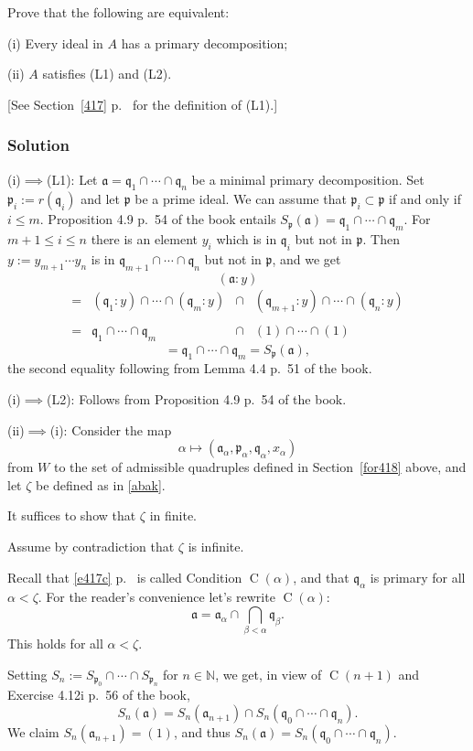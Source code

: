 \documentclass[parskip=half,fontsize=12pt]{scrartcl}%
\newcommand{\oo}{\operatorname}\newcommand{\ooo}{\operatorname*}
\newcommand{\mf}{\mathfrak}
\newcommand{\aaa}{\mf a}
\newcommand{\ppp}{\mf p}
\newcommand{\qqq}{\mf q}
\begin{document}
Prove that the following are equivalent:

(i) Every ideal in $A$ has a primary decomposition;

(ii) $A$ satisfies (L1) and (L2).

[See Section~\ref{417} p.~\pageref{417} for the definition of (L1).]

\subsubsection{Solution}%

(i)$\implies$(L1): Let $\aaa=\qqq_1\cap\cdots\cap\qqq_n$ be a minimal primary decomposition. Set $\ppp_i:=r(\qqq_i)$ and let $\ppp$ be a prime ideal. We can assume that $\ppp_i\subset\ppp$ if and only if $i\le m$. Proposition 4.9 p.~54 of the book entails $S_\ppp(\aaa)=\qqq_1\cap\cdots\cap\qqq_m$. For $m+1\le i\le n$ there is an element $y_i$ which is in $\qqq_i$ but not in $\ppp$. Then $y:=y_{m+1}\cdots y_n$ is in $\qqq_{m+1}\cap\cdots\cap\qqq_n$ but not in $\ppp$, and we get 
$$
(\aaa:y)
$$
$$
\begin{matrix}
=&(\qqq_1:y)\cap\cdots\cap(\qqq_m:y)&\cap&(\qqq_{m+1}:y)\cap\cdots\cap(\qqq_n:y)\\ \\ 
=&\qqq_1\cap\cdots\cap\qqq_m&\cap&(1)\cap\cdots\cap(1)
\end{matrix}
$$
$$
=\qqq_1\cap\cdots\cap\qqq_m=S_\ppp(\aaa),
$$ 
the second equality following from Lemma 4.4 p.~51 of the book.

(i)$\implies$(L2): Follows from Proposition 4.9 p.~54 of the book.

(ii)$\implies$(i): %
Consider the map 
$$
\alpha\mapsto(\aaa_\alpha,\ppp_\alpha,\qqq_\alpha,x_\alpha)
$$
from $W$ to the set of admissible quadruples defined in Section~\ref{for418} above, and let $\zeta$ be defined as in \eqref{abak}. 

It suffices to show that $\zeta$ in finite. 

Assume by contradiction that $\zeta$ is infinite.

Recall that \eqref{e417c} p.~\pageref{e417c} is called Condition $\oo C(\alpha)$, and that $\qqq_\alpha$ is primary for all $\alpha<\zeta$. For the reader's convenience let's rewrite $\oo C(\alpha)$:
$$
\aaa=\aaa_\alpha\cap\bigcap_{\beta<\alpha}\qqq_\beta.
$$ 
This holds for all $\alpha<\zeta$.

Setting $S_n:=S_{\ppp_0}\cap\cdots\cap S_{\ppp_n}$ for $n\in\mathbb N$, we get, in view of $\oo C(n+1)$ and Exercise 4.12i p.~56 of the book,
$$
S_n(\aaa)=S_n(\aaa_{n+1})\cap S_n(\qqq_0\cap\cdots\cap\qqq_n).
$$ 
We claim $S_n(\aaa_{n+1})=(1)$, and thus $S_n(\aaa)=S_n(\qqq_0\cap\cdots\cap\qqq_n)$.
\end{document}
